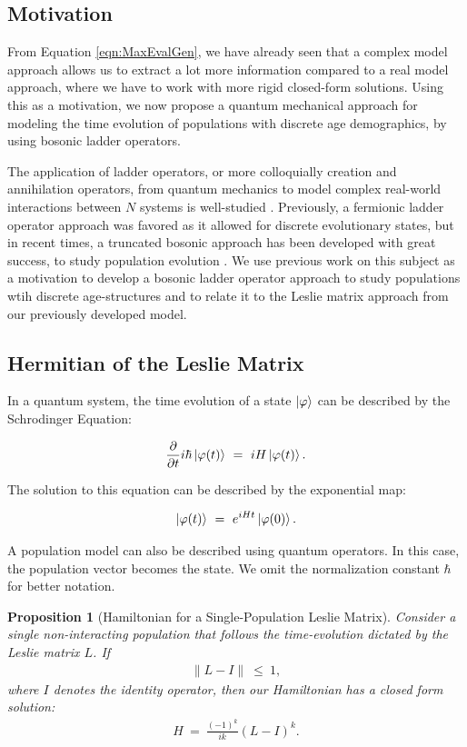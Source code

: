 \documentclass[11pt,reqno]{amsart}
\numberwithin{equation}{section}
\newtheorem{prop}[thm]{Proposition}
\theoremstyle{plain}
\begin{document}
\subsection{Motivation}
From Equation \ref{eqn:MaxEvalGen}, we have already seen that a complex model approach allows us to extract a lot more information compared to a real model approach, where we have to work with more rigid closed-form solutions. Using this as a motivation, we now propose a quantum mechanical approach for modeling the time evolution of populations with discrete age demographics, by using bosonic ladder operators. 

The application of ladder operators, or more colloquially creation and annihilation operators, from quantum mechanics to model complex real-world interactions between $N$ systems is well-studied \cite{Bag19}
. Previously, a fermionic ladder operator approach was favored as it allowed for discrete evolutionary states, but in recent times, a truncated bosonic approach has been developed with great success, to study population evolution \cite{ArG89}. We use previous work on this subject as a motivation to develop a bosonic ladder operator approach to study populations wtih discrete age-structures and to relate it to the Leslie matrix approach from our previously developed model.

\subsection{Hermitian of the Leslie Matrix}
In a quantum system, the time evolution of a state $\ket{\varphi}$ can be described by the Schrodinger Equation:

\begin{equation}
    \frac {\partial} {\partial t}i \hbar \ket{\varphi(t)} \ = \ 
    i H \ket{\varphi(t)}.
\end{equation}

The solution to this equation can be described by the exponential map:

\begin{equation}
    \ket{\varphi(t)} \ = \ e^{iHt}\ket{\varphi(0)}.
\end{equation}

A population model can also be described using quantum operators. In this case, the population vector becomes the state. We omit the normalization constant $\hbar$ for better notation. 

\begin{prop}[Hamiltonian for a Single-Population Leslie Matrix]
    Consider a single non-interacting population that follows the time-evolution dictated by the Leslie matrix $L$. If %
    \begin{align}
    \|L - I\| \ \leq \  1, 
    \end{align}
    where $I$ denotes the identity operator, then our Hamiltonian has a closed form solution:
    \begin{align}H \ = \ \frac{(-1)^k}{ik} (L - I)^k.\end{align}
\end{prop}
\end{document}
